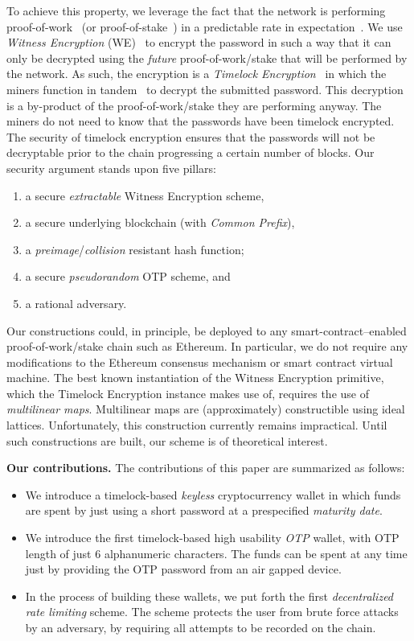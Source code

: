 To achieve this property, we leverage the fact that the network is performing
proof-of-work~\cite{pow} (or proof-of-stake~\cite{ouroboros}) in a predictable rate in expectation~\cite{bitcoin-sok}. We use \emph{Witness Encryption}
(WE)~\cite{STOC:GGSW13} to encrypt
the password in such a way that it can only be decrypted using the \emph{future}
proof-of-work/stake that will be performed by the network. As such, the encryption
is a \emph{Timelock Encryption}~\cite{timelock} in which the miners function in tandem~\cite{timelock-bitcoin} to
decrypt the submitted password. This decryption is a by-product of
the proof-of-work/stake they are performing anyway. The miners do not need to know that the
passwords have been timelock encrypted. The security of timelock encryption
ensures that the passwords will not be decryptable prior to the chain progressing
a certain number of blocks. Our security argument stands upon five pillars:

\begin{enumerate}
      \item a secure \emph{extractable} Witness Encryption scheme,
      \item a secure underlying blockchain (with \emph{Common Prefix}),
      \item a \emph{preimage}/\emph{collision} resistant hash function;
      \item a secure \emph{pseudorandom} OTP scheme, and
      \item a rational adversary.
\end{enumerate}

Our constructions could, in principle, be deployed to any smart-contract--enabled
proof-of-work/stake chain such as Ethereum. In particular, we do not require any modifications
to the Ethereum consensus mechanism or smart contract virtual machine. The
best known instantiation of the Witness Encryption primitive, which the Timelock Encryption
instance makes use of, requires the use of \emph{multilinear maps}.
Multilinear maps are (approximately) constructible using ideal lattices.
Unfortunately, this construction currently remains impractical.
Until such constructions are built, our scheme is of theoretical interest.

\noindent
\textbf{Our contributions.}
The contributions of this paper are summarized as follows:

\begin{itemize}
  \item We introduce a timelock-based \emph{keyless} cryptocurrency wallet in which funds are spent by
        just using a short password at a prespecified \emph{maturity date}.
  \item We introduce the first timelock-based high usability \emph{OTP} wallet, with OTP length of
        just 6 alphanumeric characters. The funds can be spent at any time just by
        providing the OTP password from an air gapped device.
  \item In the process of building these wallets, we put forth the first
        \emph{decentralized rate limiting} scheme. The scheme protects the user
        from brute force attacks by an adversary, by requiring all attempts to
        be recorded on the chain.
\end{itemize}


